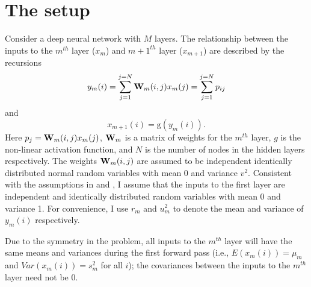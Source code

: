 \documentclass[a4paper]{article}
\newcommand{\enum}[1]{\label{eq:#1}}
\newcommand{\be}{\begin{equation}}
\newcommand{\ee}{\end{equation}}
\begin{document}
\section{The setup}
Consider a deep neural network with $M$ layers. The relationship between the inputs to the $m^{th}$ layer ($x_{m}$) and $m+1^{th}$ layer ($x_{m+1}$) are described by the recursions 
\be 
y_{m}(i) = \sum\limits_{j=1}^{j=N}{\bf{W}}_{m}(i,j)x_{m}(j) = \sum\limits_{j=1}^{j=N} p_{ij} \enum{in1}
\ee 
and 
\be 
x_{m+1}(i) = \mbox{g}(y_{m}(i)). \enum{in2} 
\ee 
Here  $p_{j} = {\bf{W}}_{m}(i,j)x_{m}(j)$, ${\bf{W}}_{m}$ is a matrix of weights for the $m^{th}$ layer,  $g$ is the non-linear activation function, and $N$ is the number of nodes in the hidden layers respectively. The weights ${\bf{W}}_{m}(i,j)$ are assumed to be independent identically distributed normal random variables with mean 0 and variance $v^{2}$. Consistent with the assumptions in \cite{glorot2010understanding} and \cite{he2015delving}, I assume that the inputs to the first layer are independent and identically distributed random variables with mean 0 and variance 1. For convenience, I use 
$r_{m}$ and $u_{m}^{2}$ to denote the mean and variance of $y_{m}(i)$ respectively.

Due to the symmetry in the problem, all inputs to the $m^{th}$ layer will have the same means and variances during the first forward pass (i.e., $E(x_{m}(i)) = \mu_m$ and  $Var(x_{m}(i)) = s_{m}^{2}$ for all $i$); the covariances between the inputs to the $m^{th}$ layer need not be 0.
\end{document}
